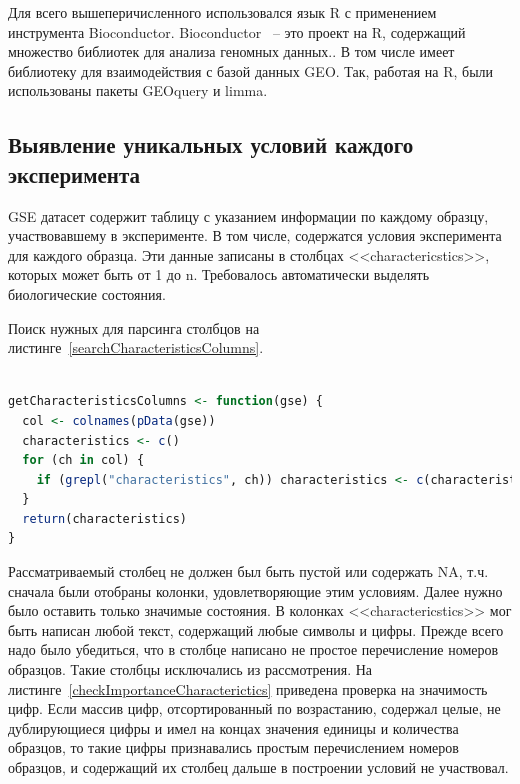 \documentclass[times,specification,annotation]{itmo-student-thesis}
\begin{document}
Для всего вышеперичисленного использовался язык R с применением инструмента Bioconductor. Bioconductor ~-- это проект на R, содержащий множество библиотек для анализа геномных данных.\cite{Bioconductor}. В том числе имеет библиотеку для взаимодействия с базой данных GEO. Так, работая на R, были использованы пакеты GEOquery и limma. 

\subsection{Выявление уникальных условий каждого эксперимента}

GSE датасет содержит таблицу с указанием информации по каждому образцу, участвовавшему в эксперименте. В том числе, содержатся условия эксперимента для каждого образца. Эти данные записаны в столбцах <<charactericstics>>, которых может быть от 1 до n. Требовалось автоматически выделять биологические состояния.  

Поиск нужных для парсинга столбцов на листинге~\ref{searchCharacteristicsColumns}. 

\begin{lstlisting}[float=!h, caption={Поиск столбцов <<charactericstics>>.}, captionpos=b, label={searchCharacteristicsColumns}, basicstyle=\footnotesize, language=R]

getCharacteristicsColumns <- function(gse) {
  col <- colnames(pData(gse))
  characteristics <- c()
  for (ch in col) {
    if (grepl("characteristics", ch)) characteristics <- c(characteristics, ch)
  }
  return(characteristics)
}

\end{lstlisting}

Рассматриваемый столбец не должен был быть пустой или содержать NA, т.ч. сначала были отобраны колонки, удовлетворяющие этим условиям. Далее нужно было оставить только значимые состояния. В колонках <<charactericstics>> мог быть написан любой текст, содержащий любые символы и цифры. Прежде всего надо было убедиться, что в столбце написано не простое перечисление номеров образцов. Такие столбцы исключались из рассмотрения. На листинге~\ref{checkImportanceCharacterictics} приведена проверка на значимость цифр. Если массив цифр, отсортированный по возрастанию, содержал целые, не дублирующиеся цифры и имел на концах значения единицы и количества образцов, то такие цифры признавались простым перечислением номеров образцов, и содержащий их столбец дальше в построении условий не участвовал.    
\end{document}
